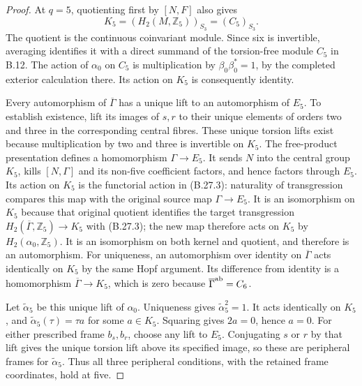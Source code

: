 \begin{proof}
At $q=5$, quotienting first by $[N,F]$ also gives
\[
       K_5=(H_2(M,\mathbb Z_5))_{S_3}=(C_5)_{S_3}.
\]
The quotient is the continuous coinvariant module. Since
six is invertible, averaging identifies it with a direct
summand of the torsion-free module $C_5$ in B.12. The action
of $\alpha_0$ on $C_5$ is multiplication by
$\beta_0\beta_0^*=1$, by the completed exterior calculation
there. Its action on $K_5$ is consequently identity.

Every automorphism of $\overline\Gamma$ has a unique lift
to an automorphism of $E_5$. To establish existence,
lift its images of $s,r$ to their unique elements of orders
two and three in the corresponding central fibres.
These unique torsion lifts exist because multiplication
by two and three is invertible on $K_5$.
The free-product presentation defines a homomorphism
$\Gamma\to E_5$. It sends $N$ into the central group
$K_5$, kills $[N,\Gamma]$ and its non-five coefficient
factors, and hence factors through $E_5$.
Its action on $K_5$ is the functorial action in (B.27.3):
naturality of transgression compares this map with the
original source map $\Gamma\to E_5$. It is an isomorphism
on $K_5$ because that original quotient identifies the target
transgression $H_2(\overline\Gamma,\mathbb Z_5)\to K_5$
with (B.27.3); the new map therefore acts on $K_5$ by
$H_2(\alpha_0,\mathbb Z_5)$.
It is an isomorphism
on both kernel and quotient, and therefore is an
automorphism. For uniqueness, an automorphism over identity
on $\overline\Gamma$ acts identically on $K_5$ by the same
Hopf argument. Its difference from identity is a
homomorphism $\overline\Gamma\to K_5$, which is zero
because $\overline\Gamma^{\rm ab}=C_6$.

Let $\widetilde\alpha_5$ be this unique lift of
$\alpha_0$. Uniqueness gives
$\widetilde\alpha_5^2=1$. It acts identically on $K_5$,
and $\widetilde\alpha_5(\tau)=\tau a$ for some
$a\in K_5$. Squaring gives $2a=0$, hence $a=0$.
For either prescribed frame $b_s,b_r$, choose any lift
to $E_5$. Conjugating $s$ or $r$ by that lift gives
the unique torsion lift above its specified image, so
these are peripheral frames for $\widetilde\alpha_5$.
Thus all three peripheral conditions, with the retained
frame coordinates, hold at five.


\end{proof}
